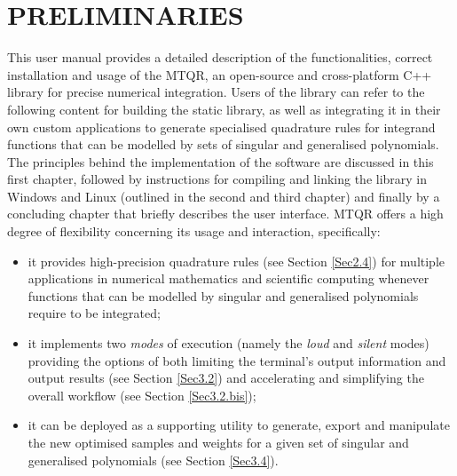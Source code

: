 \documentclass[a4paper, twosided]{book}
\begin{document}
\tableofcontents

\mainmatter


\chapter[Preliminaries]{\Huge \ttfamily PRELIMINARIES}

This user manual provides a detailed description of the functionalities, correct installation and usage of the MTQR, an open-source and cross-platform C++ library for precise numerical integration. Users of the library can refer to the following content for building the static library, as well as integrating it in their own custom applications to generate specialised quadrature rules for integrand functions that can be modelled by sets of singular and generalised polynomials. The principles behind the implementation of the software are discussed in this first chapter, followed by instructions for compiling and linking the library in Windows and Linux (outlined in the second and third chapter) and finally by a concluding chapter that briefly describes the user interface. MTQR offers a high degree of flexibility concerning its usage and interaction, specifically:
\begin{itemize}
    \item it provides high-precision quadrature rules (see Section \ref{Sec2.4}) for multiple applications in numerical mathematics and scientific computing whenever functions that can be modelled by singular and generalised polynomials require to be integrated;
    \item it implements two {\itshape modes} of execution (namely the {\itshape loud} and {\itshape silent} modes) providing the options of both limiting the terminal's output information and output results (see Section \ref{Sec3.2}) and accelerating and simplifying the overall workflow (see Section \ref{Sec3.2.bis});
    \item it can be deployed as a supporting utility to generate, export and manipulate the new optimised samples and weights for a given set of singular and generalised polynomials (see Section \ref{Sec3.4}).
\end{itemize}
\end{document}
